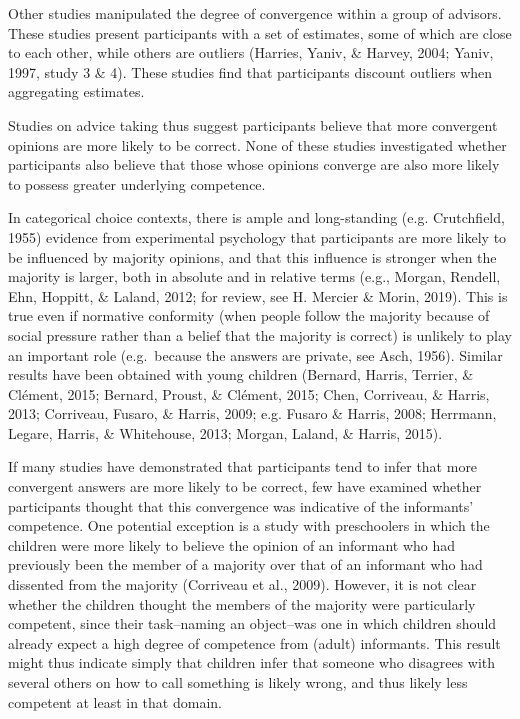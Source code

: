 \documentclass[
  doc,floatsintext]{apa6}
\begin{document}
Other studies manipulated the degree of convergence within a group of advisors. These studies present participants with a set of estimates, some of which are close to each other, while others are outliers (Harries, Yaniv, \& Harvey, 2004; Yaniv, 1997, study 3 \& 4). These studies find that participants discount outliers when aggregating estimates.

Studies on advice taking thus suggest participants believe that more convergent opinions are more likely to be correct. None of these studies investigated whether participants also believe that those whose opinions converge are also more likely to possess greater underlying competence.

In categorical choice contexts, there is ample and long-standing (e.g. Crutchfield, 1955) evidence from experimental psychology that participants are more likely to be influenced by majority opinions, and that this influence is stronger when the majority is larger, both in absolute and in relative terms (e.g., Morgan, Rendell, Ehn, Hoppitt, \& Laland, 2012; for review, see H. Mercier \& Morin, 2019). This is true even if normative conformity (when people follow the majority because of social pressure rather than a belief that the majority is correct) is unlikely to play an important role (e.g.~because the answers are private, see Asch, 1956). Similar results have been obtained with young children (Bernard, Harris, Terrier, \& Clément, 2015; Bernard, Proust, \& Clément, 2015; Chen, Corriveau, \& Harris, 2013; Corriveau, Fusaro, \& Harris, 2009; e.g. Fusaro \& Harris, 2008; Herrmann, Legare, Harris, \& Whitehouse, 2013; Morgan, Laland, \& Harris, 2015).

If many studies have demonstrated that participants tend to infer that more convergent answers are more likely to be correct, few have examined whether participants thought that this convergence was indicative of the informants' competence. One potential exception is a study with preschoolers in which the children were more likely to believe the opinion of an informant who had previously been the member of a majority over that of an informant who had dissented from the majority (Corriveau et al., 2009). However, it is not clear whether the children thought the members of the majority were particularly competent, since their task--naming an object--was one in which children should already expect a high degree of competence from (adult) informants. This result might thus indicate simply that children infer that someone who disagrees with several others on how to call something is likely wrong, and thus likely less competent at least in that domain.
\end{document}
